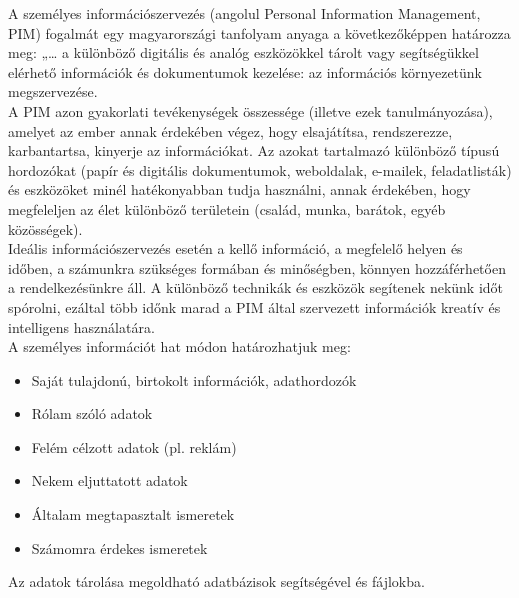 
A személyes információszervezés (angolul Personal Information Management, PIM) fogalmát egy magyarországi tanfolyam anyaga a következőképpen határozza meg: „… a különböző digitális és analóg eszközökkel tárolt vagy segítségükkel elérhető információk és dokumentumok kezelése: az információs környezetünk megszervezése.
\vspace{5pt}\\A PIM azon gyakorlati tevékenységek összessége (illetve ezek tanulmányozása), amelyet az ember annak érdekében végez, hogy elsajátítsa, rendszerezze, karbantartsa, kinyerje az információkat.
Az azokat tartalmazó különböző típusú hordozókat (papír és digitális dokumentumok, weboldalak, e-mailek, feladatlisták) és eszközöket minél hatékonyabban tudja használni, annak érdekében, hogy megfeleljen az élet különböző területein (család, munka, barátok, egyéb közösségek).
\vspace{5pt}\\Ideális információszervezés esetén a kellő információ, a megfelelő helyen és időben, a számunkra szükséges formában és minőségben, könnyen hozzáférhetően a rendelkezésünkre áll. A különböző technikák és eszközök segítenek nekünk időt spórolni, ezáltal több időnk marad a PIM által szervezett információk kreatív és intelligens használatára.
\vspace{10pt}\\A személyes információt hat módon határozhatjuk meg:
\begin{itemize}
	\item Saját tulajdonú, birtokolt információk, adathordozók
	\item Rólam szóló adatok
	\item Felém célzott adatok (pl. reklám)
	\item Nekem eljuttatott adatok
	\item Általam megtapasztalt ismeretek
	\item Számomra érdekes ismeretek
\end{itemize}

\newpage {}
Az adatok tárolása megoldható adatbázisok segítségével és fájlokba.

